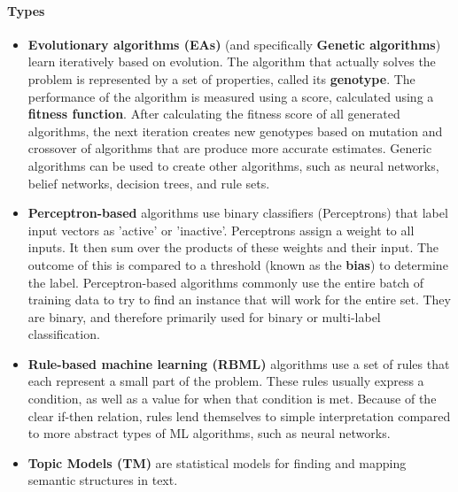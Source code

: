\paragraph{Types}
\begin{itemize}
	\item \textbf{Evolutionary algorithms (EAs)} (and 
		specifically \textbf{Genetic algorithms}) learn iteratively based on evolution. The algorithm that actually solves the problem is represented by a set of properties, called its \textbf{genotype}. The performance of the algorithm is measured using a score, calculated using a \textbf{fitness function}. After calculating the fitness score of all generated algorithms, the next iteration creates new genotypes based on mutation and crossover of algorithms that are produce more accurate estimates. Generic algorithms can be used to create other algorithms, such as neural networks, belief networks, decision trees, and rule sets.
	\item \textbf{Perceptron-based}
		algorithms use binary classifiers (Perceptrons) that label input vectors as 'active' or 'inactive'. Perceptrons assign a weight to all inputs. It then sum over the products of these weights and their input. The outcome of this is compared to a threshold (known as the \textbf{bias}) to determine the label. Perceptron-based algorithms commonly use the entire batch of training data to try to find an instance that will work for the entire set. They are binary, and therefore primarily used for binary or multi-label classification.
	\item \textbf{Rule-based machine learning (RBML)}
		algorithms use a set of rules that each represent a small part of the problem. These rules usually express a condition, as well as a value for when that condition is met. Because of the clear if-then relation, rules lend themselves to simple interpretation compared to more abstract types of ML algorithms, such as neural networks.
	\item \textbf{Topic Models (TM)}
		are statistical models for finding and mapping semantic structures in text.
\end{itemize}

